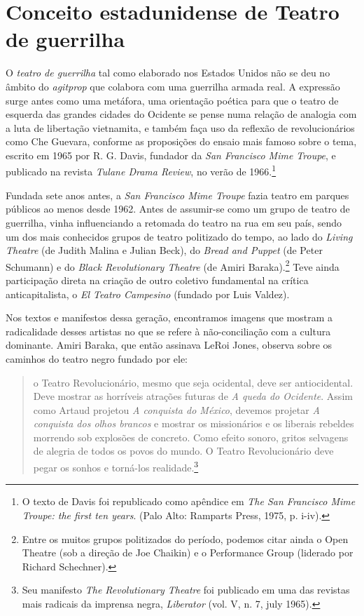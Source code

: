 \section{Conceito estadunidense de Teatro de guerrilha}

O \textit{teatro de guerrilha} tal como elaborado nos Estados Unidos não se
deu no âmbito do \textit{agitprop} que colabora com uma guerrilha armada
real. A expressão surge antes como uma metáfora, uma orientação poética
para que o teatro de esquerda das grandes cidades do Ocidente se pense
numa relação de analogia com a luta de libertação vietnamita, e também
faça uso da reflexão de revolucionários como Che Guevara, conforme as
proposições do ensaio mais famoso sobre o tema, escrito em 1965 por R.
G. Davis, fundador da \textit{San Francisco Mime Troupe}, e publicado na
revista \textit{Tulane Drama Review}, no verão de 1966.\footnote{O texto de
  Davis foi republicado como apêndice em \textit{The San Francisco Mime
  Troupe: the first ten years}. (Palo Alto: Ramparts Press, 1975, p.
  i-iv).}

Fundada sete anos antes, a \textit{San Francisco Mime Troupe} fazia teatro
em parques públicos ao menos desde 1962. Antes de assumir-se como um
grupo de teatro de guerrilha, vinha influenciando a retomada do teatro
na rua em seu país, sendo um dos mais conhecidos grupos de teatro
politizado do tempo, ao lado do \textit{Living Theatre} (de Judith Malina e
Julian Beck), do \textit{Bread and Puppet} (de Peter Schumann) e do
\textit{Black Revolutionary Theatre} (de Amiri Baraka).\footnote{Entre os
  muitos grupos politizados do período, podemos citar ainda o Open
  Theatre (sob a direção de Joe Chaikin) e o Performance Group (liderado
  por Richard Schechner).} Teve ainda participação direta na criação de
outro coletivo fundamental na crítica anticapitalista, o \textit{El Teatro
Campesino} (fundado por Luis Valdez).

Nos textos e manifestos dessa geração, encontramos imagens que mostram a
radicalidade desses artistas no que se refere à não-conciliação com a
cultura dominante. Amiri Baraka, que então assinava LeRoi Jones, observa
sobre os caminhos do teatro negro fundado por ele:

\begin{quote}
o Teatro Revolucionário, mesmo que seja ocidental, deve ser
antiocidental. Deve mostrar as horríveis atrações futuras de \textit{A
queda do Ocidente}. Assim como Artaud projetou \textit{A conquista do
México}, devemos projetar \textit{A conquista dos olhos brancos} e mostrar
os missionários e os liberais rebeldes morrendo sob explosões de
concreto. Como efeito sonoro, gritos selvagens de alegria de todos os
povos do mundo. O Teatro Revolucionário deve pegar os sonhos e torná-los
realidade.\footnote{Seu manifesto \textit{The Revolutionary Theatre} foi
  publicado em uma das revistas mais radicais da imprensa negra,
  \textit{Liberator} (vol. V, n. 7, july 1965).}
\end{quote}

